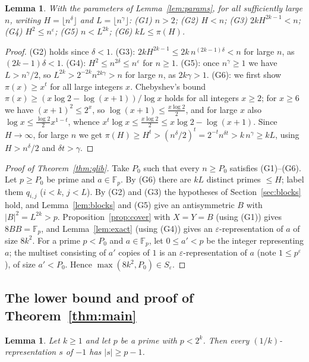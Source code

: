 \documentclass[11pt]{amsart}
\theoremstyle{plain}
\newtheorem{lemma}[theorem]{Lemma}
\theoremstyle{definition}
\newcommand{\F}{\mathbb{F}_p}
\newcommand{\eps}{\varepsilon}
\begin{document}
{\begin{lemma}\label{lem:good}
With the parameters of Lemma~\ref{lem:params}, for all sufficiently large $n$, writing $H=\lfloor n^\delta\rfloor$ and $L=\lfloor n^\gamma\rfloor$:
\textup{(G1)} $n>2$; \textup{(G2)} $H<n$; \textup{(G3)} $2kH^{2k-1}<n$; \textup{(G4)} $H^2\le n^\eps$; \textup{(G5)} $n<L^{2k}$; \textup{(G6)} $kL\le\pi(H)$.
\end{lemma}

\begin{proof}
(G2) holds since $\delta<1$. (G3): $2kH^{2k-1}\le2k\,n^{(2k-1)\delta}<n$ for large $n$, as $(2k-1)\delta<1$. (G4): $H^2\le n^{2\delta}\le n^\eps$ for $n\ge1$. (G5): once $n^\gamma\ge1$ we have $L>n^\gamma/2$, so $L^{2k}>2^{-2k}n^{2k\gamma}>n$ for large $n$, as $2k\gamma>1$.
(G6): we first show $\pi(x)\ge x^t$ for all large integers $x$. Chebyshev's bound $\pi(x)\ge(x\log2-\log(x+1))/\log x$ holds for all integers $x\ge2$; for $x\ge6$ we have $(x+1)^2\le2^x$, so $\log(x+1)\le\frac{x\log2}2$, and for large $x$ also $\log x\le\frac{\log2}{2}x^{1-t}$, whence $x^t\log x\le\frac{x\log 2}{2}\le x\log2-\log(x+1)$. Since $H\to\infty$, for large $n$ we get $\pi(H)\ge H^t>(n^\delta/2)^t=2^{-t}n^{\delta t}>k\,n^\gamma\ge kL$, using $H>n^\delta/2$ and $\delta t>\gamma$.
\end{proof}

\begin{proof}[Proof of Theorem~\ref{thm:glib}]
Take $P_0$ such that every $n\ge P_0$ satisfies (G1)--(G6). Let $p\ge P_0$ be prime and $a\in\F$. By (G6) there are $kL$ distinct primes $\le H$; label them $q_{i,j}$ ($i<k$, $j<L$). By (G2) and (G3) the hypotheses of Section~\ref{sec:blocks} hold, and Lemma~\ref{lem:blocks} and (G5) give an antisymmetric $B$ with $|B|^2=L^{2k}>p$. Proposition~\ref{prop:cover} with $X=Y=B$ (using (G1)) gives $8BB=\F$, and Lemma~\ref{lem:exact} (using (G4)) gives an $\eps$-representation of $a$ of size $8k^2$.
For a prime $p<P_0$ and $a\in\F$, let $0\le a'<p$ be the integer representing $a$; the multiset consisting of $a'$ copies of $1$ is an $\eps$-representation of $a$ (note $1\le p^\eps$), of size $a'<P_0$. Hence $\max(8k^2,P_0)\in S_\eps$.
\end{proof}

\subsection{The lower bound and proof of Theorem~\ref{thm:main}}\label{sec:refute}

\begin{lemma}\label{lem:one}
Let $k\ge1$ and let $p$ be a prime with $p<2^k$. Then every $(1/k)$-representation $s$ of $-1$ has $|s|\ge p-1$.
\end{lemma}

}
\end{document}
